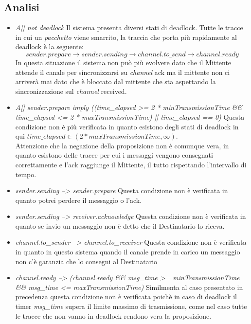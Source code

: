 \documentclass[a4paper]{article}
\newcommand{\channel}{\textit{channel }}
\newcommand{\pacchetto}{\textit{pacchetto }}
\begin{document}
\subsection{Analisi}
\begin{itemize}
        \item \textit{A[] not deadlock}
                Il sistema presenta diversi stati di deadlock. Tutte le tracce in cui un \pacchetto viene smarrito, la traccia che porta più rapidamente al deadlock è la seguente:
                $$ sender.prepare \rightarrow sender.sending \rightarrow channel.to\_send \rightarrow channel.ready $$ 
                In questa situazione il sistema non può più evolvere dato che il Mittente attende il canale per sincronizzarsi su \channel ack ma il mittente non ci arriverà mai dato che è bloccato dal mittente che sta aspettando la sincronizzazione sul \channel received.
        \item \textit{A[] sender.prepare imply ((time\_elapsed >= 2 * minTransmissionTime \&\& time\_elapsed <= 2 * maxTransmissionTime) || time\_elapsed == 0)}
                Questa condizione non è più verificata in quanto esistono degli stati di deadlock in qui $time\_elapsed \in (2 * maxTransmissionTime, \infty)$.\\
                Attenzione che la negazione della proposizione non è comunque vera, in quanto esistono delle tracce per cui i messaggi vengono consegnati correttamente e l'ack raggiunge il Mittente, il tutto rispettando l'intervallo di tempo.
        \item \textit{sender.sending --> sender.prepare}
                Questa condizione non è verificata in quanto potrei perdere il messaggio o l'ack.
        \item \textit{sender.sending --> receiver.acknowledge}
                Questa condizione non è verificata in quanto se invio un messaggio non è detto che il Destinatario lo riceva.
        \item \textit{channel.to\_sender --> channel.to\_receiver}
                Questa condizione non è verificata in quanto in questo sistema quando il canale prende in carico un messaggio non c'è garanzia che lo consegni al Destinatario
        \item \textit{channel.ready --> (channel.ready \&\& msg\_time >= minTransmissionTime \&\& msg\_time <= maxTransmissionTime)}
                Similmenta al caso presentato in precedenza questa condizione non è verificata poichè in caso di deadlock il timer \textit{msg\_time} supera il limite massimo di trasmissione, come nel caso tutte le tracce che non vanno in deadlock rendono vera la proposizione. 
\end{itemize}

\end{document}
